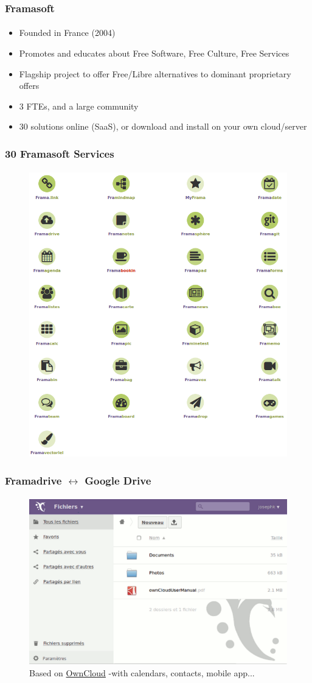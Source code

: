 \documentclass{beamer}
\begin{document}
	\begin{frame}
	\frametitle{Framasoft}
	\framesubtitle{}
		\begin{itemize}
			\item Founded in France (2004)
			\item Promotes and educates about Free Software, Free Culture, Free Services
			\item Flagship project to offer Free/Libre alternatives to dominant proprietary offers
			\item 3 FTEs, and a large community
			\item 30 solutions online (SaaS), or download and install on your own cloud/server
		\end{itemize}
	\end{frame}

	\begin{frame}
	\frametitle{30 Framasoft Services}
	\framesubtitle{}
	        \begin{figure}[h]
                \centering
                \includegraphics[width=.6\textwidth]{./images/framasoft-solutions}
        	\end{figure}
	\end{frame}

	\begin{frame}
	\frametitle{Framadrive $\leftrightarrow$ Google Drive}
	\framesubtitle{}
	        \begin{figure}[h]
                \centering
                \includegraphics[width=.8\textwidth]{./images/framadrive}
		\caption{Based on \href{https://owncloud.org/}{OwnCloud} -with calendars, contacts, mobile app...}
        	\end{figure}
	\end{frame}
\end{document}
